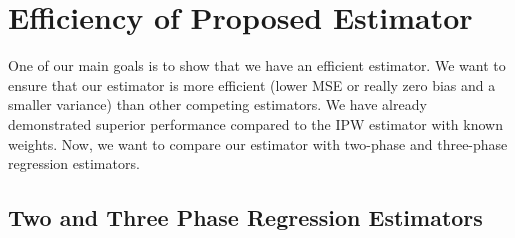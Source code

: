 
\section*{Efficiency of Proposed Estimator}

One of our main goals is to show that we have an efficient estimator. We
want to ensure that our estimator is more efficient (lower MSE or really zero
bias and a smaller variance) than other competing estimators. We have already
demonstrated superior performance compared to the IPW estimator with known
weights. Now, we want to compare our estimator with two-phase and three-phase 
regression estimators.

\subsection*{Two and Three Phase Regression Estimators}

